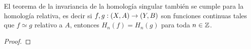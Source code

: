 \begin{ejercicio}\label{ej:67}
  El teorema de la invariancia de la homolog\'ia singular tambi\'en se cumple para
  la homolog\'ia relativa, es decir si $f,g:(X,A)\rightarrow(Y,B)$ son funciones continuas
  tales que $f\simeq g$ relativo a $A$, entonces $H_n(f)=H_n(g)$ para toda $n\in\mathbb{Z}$.
\end{ejercicio}
\begin{proof}%

\end{proof}%

